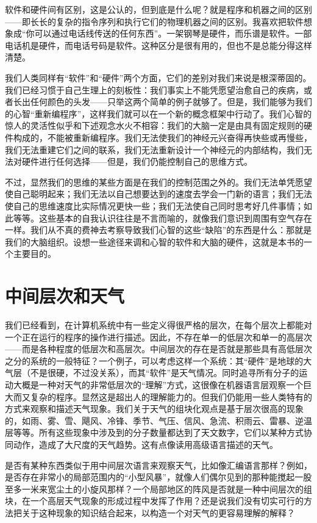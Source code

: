 软件和硬件间有区别，这是公认的，但到底是什么呢？就是程序和机器之间的区别——即长长的复杂的指令序列和执行它们的物理机器之间的区别。我喜欢把软件想象成“你可以通过电话线传送的任何东西”。一架钢琴是硬件，而乐谱是软件。一部电话机是硬件，而电话号码是软件。这种区分是很有用的，但也不是总能分得这样清楚。

我们人类同样有“软件”和“硬件”两个方面，它们的差别对我们来说是根深蒂固的。我们已经习惯于自己生理上的刻板性：我们事实上不能凭愿望治愈自己的疾病，或者长出任何颜色的头发——只举这两个简单的例子就够了。但是，我们能够为我们的心智“重新编程序”，这样我们就可以在一个新的概念框架中行动了。我们心智的惊人的灵活性似乎和下述观念水火不相容：我们的大脑一定是由具有固定规则的硬件构成的，不能被重新编程序。我们无法使我们的神经元兴奋得再快些或再慢些，我们无法重建它们之间的联系，我们无法重新设计一个神经元的内部结构，我们无法对硬件进行任何选择——但是，我们仍能控制自己的思维方式。

不过，显然我们的思维的某些方面是在我们的控制范围之外的。我们无法单凭愿望使自己聪明起来；我们无法以自己想要达到的速度去学会一门新的语言；我们无法使自己的思维速度比实际情况更快一些；我们无法使自己同时思考好几件事情；如此等等。这些基本的自我认识往往是不言而喻的，就像我们意识到周围有空气存在一样。我们从不真的费神去考察导致我们心智的这些“缺陷”的东西是什么：那就是我们的大脑组织。设想一些途径来调和心智的软件和大脑的硬件，这就是本书的一个主要目的。

\section{中间层次和天气}

我们已经看到，在计算机系统中有一些定义得很严格的层次，在每个层次上都能对一个正在运行的程序的操作进行描述。因此，不存在单一的低层次和单一的高层次——而是各种程度的低层次和高层次。中间层次的存在是否就是那些具有高低层次之分的系统的一般特征？一个例子，可以考虑这样一个系统：其“硬件”是地球的大气层（不是很硬，不过没关系），而其“软件”是天气情况。同时追寻所有分子的运动大概是一种对天气的非常低层次的“理解”方式，这很像在机器语言层观察一个巨大而又复杂的程序。显然这是超出人的理解能力的。但我们仍能用一些人类特有的方式来观察和描述天气现象。我们关于天气的组块化观点是基于层次很高的现象的，如雨、雾、雪、飓风、冷锋、季节、气压、信风、急流、积雨云、雷暴、逆温层等等。所有这些现象中涉及到的分子数量都达到了天文数字，它们以某种方式协同动作，造成了大尺度的天气趋势。这有点像读用高级语言描述的天气。

是否有某种东西类似于用中间层次语言来观察天气，比如像汇编语言那样？例如，是否存在非常小的局部范围内的“小型风暴”，就像人们偶尔见到的那种能搅起一股至多一米来宽尘土的小旋风那样？一个局部地区的阵风是否就是一种中间层次的组块，在一个高层天气现象的形成过程中发挥了作用？还是说我们没有切实可行的方法把关于这种现象的知识结合起来，以构造一个对天气的更容易理解的解释？

